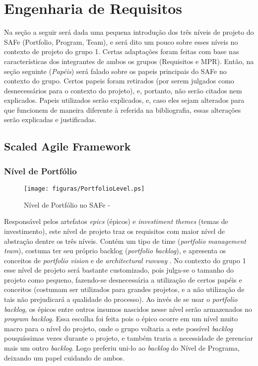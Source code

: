 \chapter[Engenharia de Requisitos]{Engenharia de Requisitos}
Na seção a seguir será dada uma pequena introdução dos três níveis de projeto do SAFe (Portfolio, Program, Team), e será dito um pouco sobre esses níveis no contexto de projeto do grupo 1. Certas adaptações foram feitas com base nas características dos integrantes de ambos os grupos (Requisitos e MPR). Então, na seção seguinte (\emph{Papéis}) será falado sobre os papeis principais do SAFe no contexto do grupo. Certos papeis foram retirados (por serem julgados como desnecessários para o contexto do projeto), e, portanto, não serão citados nem explicados. Papeis utilizados serão explicados, e, caso eles sejam alterados para que funcionem de maneira diferente à referida na bibliografia, essas alterações serão explicadas e justificadas.

\section{Scaled Agile Framework}
\subsection{Nível de Portfólio}
\begin{figure}[h]
  \centering
  \caption{Nível de Portfólio no SAFe - \cite[p. 44]{safe001}}
  \texttt{[image: figuras/PortfolioLevel.ps]}
\end{figure}

Responsável pelos artefatos \emph{epics} (épicos) e \emph{investiment themes} (temas de investimento), este nível de projeto traz os requisitos com maior nível de abstração dentre os três níveis. Contém um tipo de time (\emph{portfolio management team}), costuma ter seu próprio backlog (\emph{portfolio backlog}), e apresenta os conceitos de \emph{portfolio vision} e de \emph{architectural runway} \cite[p. 227-228]{safe001}. No contexto do grupo 1 esse nível de projeto será bastante customizado, pois julga-se o tamanho do projeto como pequeno, fazendo-se desnecessária a utilização de certos papéis e conceitos (costumam ser utilizados para grandes projetos, e a não utilização de tais não prejudicará a qualidade do processo). Ao invés de se usar o \emph{portfolio backlog}, os épicos entre outros insumos nascidos nesse nível serão armazenados no \emph{program backlog}. Essa escolha foi feita pois o épico ocorre em um nível muito macro para o nível do projeto, onde o grupo voltaria a este possível \emph{backlog} pouquíssimas vezes durante o projeto, e também traria a necessidade de gerenciar mais um outro \emph{backlog}. Logo preferiu uni-lo ao \emph{backlog} do Nível de Programa, deixando um papel cuidando de ambos.

